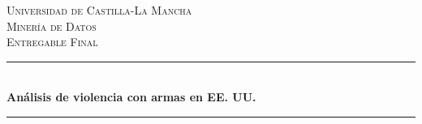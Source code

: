 \documentclass[11pt,a4paper]{article}
\begin{document}


\begin{titlepage} %
	\newcommand{\HRule}{\rule{\linewidth}{0.5mm}} %
	
	\center %
	
	
	\textsc{\LARGE Universidad de Castilla-La Mancha}\\[1.5cm] %
	
	\textsc{\Large Minería de Datos}\\[0.5cm] %
	
	\textsc{\large Entregable Final}\\[0.5cm] %
	
	
	\HRule\\[0.4cm]
	
	{\huge\bfseries Análisis de violencia con armas en EE. UU.}\\[0.4cm] %
	
	\HRule\\[1.5cm]
	
	

\end{titlepage}
\end{document}
